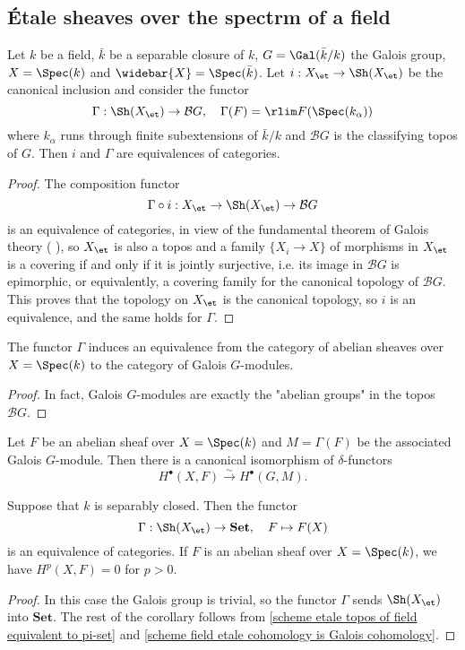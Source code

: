 \subsection{\'Etale sheaves over the spectrm of a field}
\begin{proposition}\label{scheme etale topos of field equivalent to pi-set}
Let $k$ be a field, $\bar{k}$ be a separable closure of $k$, $G=\Gal(\bar{k}/k)$ the Galois group, $X=\Spec(k)$ and $\widebar{X}=\Spec(\bar{k})$. Let $i:X_\et\to\Sh(X_\et)$ be the canonical inclusion and consider the functor
\[\Gamma:\Sh(X_\et)\to \mathcal{B}G,\quad \Gamma(F)=\rlim F(\Spec(k_\alpha))\]
where $k_\alpha$ runs through finite subextensions of $\bar{k}/k$ and $\mathcal{B}G$ is the classifying topos of $G$. Then $i$ and $\Gamma$ are equivalences of categories.
\end{proposition}
\begin{proof}
The composition functor
\[\Gamma\circ i:X_\et\to\Sh(X_\et)\to \mathcal{B}G\]
is an equivalence of categories, in view of the fundamental theorem of Galois theory (\cite{SGA1} ), so $X_\et$ is also a topos and a family $\{X_i\to X\}$ of morphisms in $X_\et$ is a covering if and only if it is jointly surjective, i.e. its image in $\mathcal{B}G$ is epimorphic, or equivalently, a covering family for the canonical topology of $\mathcal{B}G$. This proves that the topology on $X_\et$ is the canonical topology, so $i$ is an equivalence, and the same holds for $\Gamma$.
\end{proof}

\begin{corollary}\label{scheme etale abelian sheaf of field equivalence to Galois module}
The functor $\Gamma$ induces an equivalence from the category of abelian sheaves over $X=\Spec(k)$ to the category of Galois $G$-modules.
\end{corollary}
\begin{proof}
In fact, Galois $G$-modules are exactly the "abelian groups" in the topos $\mathcal{B}G$.
\end{proof}

\begin{corollary}\label{scheme field etale cohomology is Galois cohomology}
Let $F$ be an abelian sheaf over $X=\Spec(k)$ and $M=\Gamma(F)$ be the associated Galois $G$-module. Then there is a canonical isomorphism of $\delta$-functors
\[H^\bullet(X,F) \stackrel{\sim}{\to} H^\bullet(G,M).\]
\end{corollary}

\begin{corollary}\label{scheme separably closed field etale topos is set}
Suppose that $k$ is separably closed. Then the functor
\[\Gamma:\Sh(X_\et)\to\mathbf{Set},\quad F\mapsto F(X)\]
is an equivalence of categories. If $F$ is an abelian sheaf over $X=\Spec(k)$, we have $H^p(X,F)=0$ for $p>0$.  
\end{corollary}
\begin{proof}
In this case the Galois group is trivial, so the functor $\Gamma$ sends $\Sh(X_\et)$ into $\mathbf{Set}$. The rest of the corollary follows from \cref{scheme etale topos of field equivalent to pi-set} and \cref{scheme field etale cohomology is Galois cohomology}.
\end{proof}

